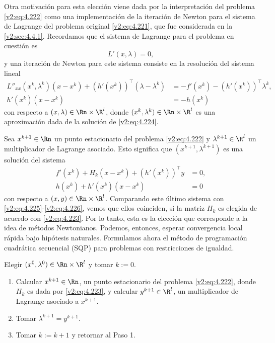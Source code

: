 Otra motivación para esta elección viene dada por la interpretación del problema \eqref{v2:eq:4.222} como una implementación de la iteración de Newton para el sistema de Lagrange del problema original \eqref{v2:eq:4.221}, que fue considerada en la \cref{v2:sec:4.4.1}. Recordamos que el sistema de Lagrange para el problema en cuestión es
\begin{equation}
L'(x, \lambda) = 0,
\label{v2:eq:4.224}
\end{equation}
y una iteración de Newton para este sistema consiste en la resolución del sistema lineal
\begin{align}
L''_{xx}(x^k, \lambda^k)(x - x^k) + (h'(x^k))^\top(\lambda - \lambda^k) &= -f'(x^k) - (h'(x^k))^\top\lambda^k, \label{v2:eq:4.225} \\
h'(x^k)(x - x^k) &= -h(x^k) \label{v2:eq:4.226}
\end{align}
con respecto a $(x, \lambda) \in \Rn \times \R^l$, donde $(x^k, \lambda^k) \in \Rn \times \R^l$ es una aproximación dada de la solución de \eqref{v2:eq:4.224}.

Sea $x^{k+1} \in \Rn$ un punto estacionario del problema \eqref{v2:eq:4.222} y $\lambda^{k+1} \in \R^l$ un multiplicador de Lagrange asociado. Esto significa que $(x^{k+1}, \lambda^{k+1})$ es una solución del sistema
\begin{align*}
f'(x^k) + H_k(x - x^k) + (h'(x^k))^\top y &= 0, \\
h(x^k) + h'(x^k)(x - x^k) &= 0
\end{align*}
con respecto a $(x, y) \in \Rn \times \R^l$. Comparando este último sistema con \eqref{v2:eq:4.225}-\eqref{v2:eq:4.226}, vemos que ellos coinciden, si la matriz $H_k$ es elegida de acuerdo con \eqref{v2:eq:4.223}. Por lo tanto, esta es la elección que corresponde a la idea de métodos Newtonianos. Podemos, entonces, esperar convergencia local rápida bajo hipótesis naturales. Formulamos ahora el método de programación cuadrática secuencial (SQP) para problemas con restricciones de igualdad.

\begin{algorithm}
\label{v2:alg:4.6.1}
Elegir $(x^0, \lambda^0) \in \Rn \times \R^l$ y tomar $k := 0$.
\begin{enumerate}
    \item Calcular $x^{k+1} \in \Rn$, un punto estacionario del problema \eqref{v2:eq:4.222}, donde $H_k$ es dada por \eqref{v2:eq:4.223}, y calcular $y^{k+1} \in \R^l$, un multiplicador de Lagrange asociado a $x^{k+1}$.
    \item Tomar $\lambda^{k+1} = y^{k+1}$.
    \item Tomar $k := k + 1$ y retornar al Paso 1.
\end{enumerate}
\end{algorithm}

